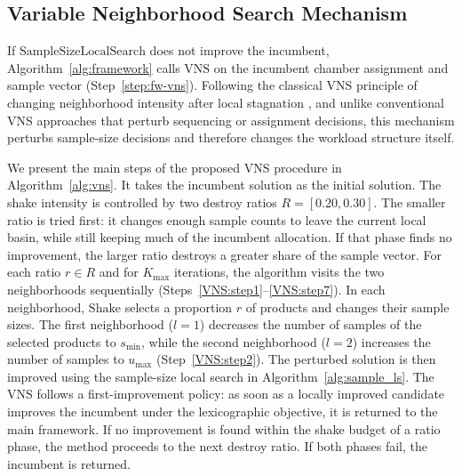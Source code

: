 \subsection{Variable Neighborhood Search Mechanism}
\label{subsec:vns}
\label{subsec:vns_diversification}

If \(\mathrm{SampleSizeLocalSearch}\) does not improve the incumbent,
Algorithm~\ref{alg:framework} calls \(\mathrm{VNS}\) on the incumbent
chamber assignment and sample vector (Step~\ref{step:fw-vns}).
Following the classical VNS principle of changing neighborhood
intensity after local stagnation \citep{LiaoCheng2007}, and unlike
conventional VNS approaches that perturb sequencing or assignment
decisions, this mechanism perturbs sample-size decisions and therefore
changes the workload structure itself.

We present the main steps of the proposed VNS procedure in
Algorithm~\ref{alg:vns}.
It takes the incumbent solution as the initial solution.
The shake intensity is controlled by two destroy ratios
\(R=[0.20,0.30]\).
The smaller ratio is tried first: it changes enough sample counts to
leave the current local basin, while still keeping much of the
incumbent allocation.
If that phase finds no improvement, the larger ratio destroys a
greater share of the sample vector.
For each ratio \(r\in R\) and for \(K_{\max}\) iterations, the
algorithm visits the two neighborhoods sequentially
(Steps~\ref{VNS:step1}--\ref{VNS:step7}).
In each neighborhood, \(\mathrm{Shake}\) selects a proportion \(r\) of
products and changes their sample sizes.
The first neighborhood (\(l=1\)) decreases the number of samples of
the selected products to \(s_{\min}\), while the second neighborhood
(\(l=2\)) increases the number of samples to \(u_{\max}\)
(Step~\ref{VNS:step2}).
The perturbed solution is then improved using the sample-size local
search in Algorithm~\ref{alg:sample_ls}.
The VNS follows a first-improvement policy: as soon as a locally
improved candidate improves the incumbent under the lexicographic
objective, it is returned to the main framework.
If no improvement is found within the shake budget of a ratio phase,
the method proceeds to the next destroy ratio.
If both phases fail, the incumbent is returned.

